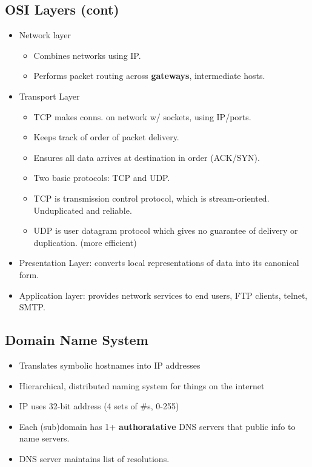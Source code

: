 \documentclass[fontsize=5pt]{scrartcl}
\begin{document}
\begin{multicols}{3}
     \subsection{OSI Layers (cont)}
       \begin{itemize}
         \item Network layer
         \begin{itemize}
           \item Combines networks using IP. 
           \item Performs packet routing across \textbf{gateways}, intermediate hosts.
         \end{itemize}
         \item Transport Layer
         \begin{itemize}
           \item TCP makes conns. on network w/ sockets, using IP/ports.
           \item Keeps track of order of packet delivery.
           \item Ensures all data arrives at destination in order (ACK/SYN).
           \item Two basic protocols: TCP and UDP.
           \item TCP is transmission control protocol, which is stream-oriented. Unduplicated and reliable.
           \item UDP is user datagram protocol which gives no guarantee of delivery or duplication. (more efficient)
         \end{itemize}
          \item Presentation Layer: converts local representations of data into its canonical form.
          \item Application layer: provides network services to end users, FTP clients, telnet, SMTP.
        \end{itemize}
     \subsection{Domain Name System}
       \begin{itemize}
         \item Translates symbolic hostnames into IP addresses
         \item Hierarchical, distributed naming system for things on the internet
         \item IP uses 32-bit address (4 sets of \#s, 0-255)
         \item Each (sub)domain has 1+ \textbf{authoratative} DNS servers that public info to name servers.
         \item DNS server maintains list of resolutions.
       \end{itemize}
      

\end{multicols}
\end{document}
